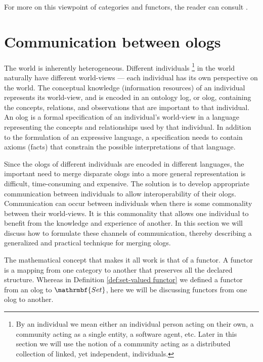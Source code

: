 \documentclass{amsart}
\theoremstyle{remark}
\theoremstyle{definition}
\begin{document}
For more on this viewpoint of categories and functors, the reader can consult \cite{Spi-Cats}.



\section{Communication between ologs}\label{sec:connecting ologs}

The world is inherently heterogeneous. 
Different individuals 
%
\footnote{By an individual we mean 
either an individual person acting on their own, a community acting as a single entity, a software agent, etc.
Later in this section
we will use the notion of a community acting as a distributed collection of linked, yet independent, individuals.}
%
in the world naturally have different world-views 
--- each individual has its own perspective on the world. 
The conceptual knowledge (information resources) of an individual represents its world-view, 
and is encoded in an ontology log, or olog, containing the concepts, relations, and observations 
that are important to that individual.
An olog is a formal specification of 
an individual's world-view in a language representing the concepts and relationships used by that individual. 
In addition to the formulation of an expressive language,
a specification needs to contain axioms (facts) that constrain the possible interpretations of that language. 

Since the ologs of different individuals are encoded in different languages, 
the important need to merge disparate ologs into a more general representation 
is difficult, time-consuming and expensive. 
The solution is to develop appropriate communication between individuals to allow interoperability of their ologs.
Communication can occur between individuals when there is some commonality between their world-views. 
It is this commonality that allows one individual to benefit from the knowledge and experience of another. 
In this section we will discuss how to formulate these channels of communication, 
thereby describing a generalized and practical technique for merging ologs.

The mathematical concept that makes it all work is that of a functor. 
A functor is a mapping from one category to another that preserves all the declared structure.
Whereas in Definition \ref{def:set-valued functor} 
we defined a functor from an olog to $\mathrmbf{Set}$, 
here we will be discussing functors from one olog to another. 
\end{document}
